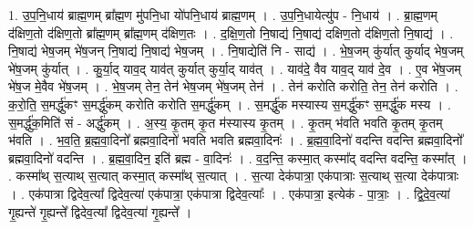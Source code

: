 \documentclass[17pt]{extarticle}
\begin{document}
1. उ॒प॒नि॒धाय॑ ब्राह्म॒णम् ब्रा᳚ह्म॒ण मु॑पनि॒धा यो॑पनि॒धाय॑ ब्राह्म॒णम् । . उ॒प॒नि॒धायेत्यु॑प - नि॒धाय॑ । . ब्रा॒ह्म॒णम् द॑क्षिण॒तो द॑क्षिण॒तो ब्रा᳚ह्म॒णम् ब्रा᳚ह्म॒णम् द॑क्षिण॒तः । . द॒क्षि॒ण॒तो नि॒षाद्य॑ नि॒षाद्य॑ दक्षिण॒तो द॑क्षिण॒तो नि॒षाद्य॑ । . नि॒षाद्य॑ भेष॒जम् भे॑ष॒जन् नि॒षाद्य॑ नि॒षाद्य॑ भेष॒जम् । . नि॒षाद्येति॑ नि - साद्य॑ । . भे॒ष॒जम् कु॑र्यात् कुर्याद् भेष॒जम् भे॑ष॒जम् कु॑र्यात् । . कु॒र्या॒द् याव॒द् याव॑त् कुर्यात् कुर्या॒द् याव॑त् । . याव॑दे॒ वैव याव॒द् याव॑ दे॒व । . ए॒व भे॑ष॒जम् भे॑ष॒ज मे॒वैव भे॑ष॒जम् । . भे॒ष॒जम् तेन॒ तेन॑ भेष॒जम् भे॑ष॒जम् तेन॑ । . तेन॑ करोति करोति॒ तेन॒ तेन॑ करोति । . क॒रो॒ति॒ स॒मर्द्धु॑कꣳ स॒मर्द्धु॑कम् करोति करोति स॒मर्द्धु॑कम् । . स॒मर्द्धु॑क मस्यास्य स॒मर्द्धु॑कꣳ स॒मर्द्धु॑क मस्य । . स॒मर्द्धु॑क॒मिति॑ सं - अर्द्धु॑कम् । . अ॒स्य॒ कृ॒तम् कृ॒त म॑स्यास्य कृ॒तम् । . कृ॒तम् भ॑वति भवति कृ॒तम् कृ॒तम् भ॑वति । . भ॒व॒ति॒ ब्र॒ह्म॒वा॒दिनो᳚ ब्रह्मवा॒दिनो॑ भवति भवति ब्रह्मवा॒दिनः॑ । . ब्र॒ह्म॒वा॒दिनो॑ वदन्ति वदन्ति ब्रह्मवा॒दिनो᳚ ब्रह्मवा॒दिनो॑ वदन्ति । . ब्र॒ह्म॒वा॒दिन॒ इति॑ ब्रह्म - वा॒दिनः॑ । . व॒द॒न्ति॒ कस्मा॒त् कस्मा᳚द् वदन्ति वदन्ति॒ कस्मा᳚त् । . कस्मा᳚थ् स॒त्याथ् स॒त्यात् कस्मा॒त् कस्मा᳚थ् स॒त्यात् । . स॒त्या देक॑पात्रा॒ एक॑पात्राः स॒त्याथ् स॒त्या देक॑पात्राः । . एक॑पात्रा द्विदेव॒त्या᳚ द्विदेव॒त्या॑ एक॑पात्रा॒ एक॑पात्रा द्विदेव॒त्याः᳚ । . एक॑पात्रा॒ इत्येक॑ - पा॒त्राः॒ । . द्वि॒दे॒व॒त्या॑ गृ॒ह्यन्ते॑ गृ॒ह्यन्ते᳚ द्विदेव॒त्या᳚ द्विदेव॒त्या॑ गृ॒ह्यन्ते᳚ । \newline
\end{document}
